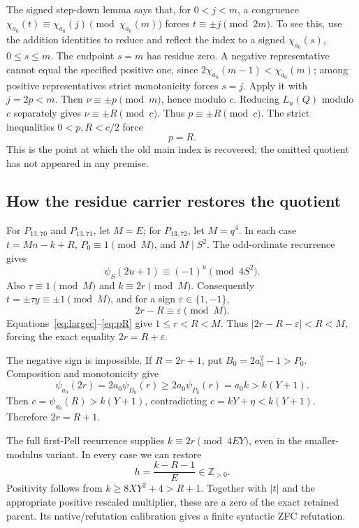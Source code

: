 \documentclass[11pt]{article}
\theoremstyle{remark}\newtheorem{remark}[theorem]{Remark}
\begin{document}
The signed step-down lemma says that, for $0<j<m$, a congruence
$\chi_{a_0}(t)\equiv\chi_{a_0}(j)\pmod{\chi_{a_0}(m)}$
forces $t\equiv\pm j\pmod{2m}$. To see this, use the addition
identities to reduce and reflect the index to a signed
$\chi_{a_0}(s)$, $0\le s\le m$. The endpoint $s=m$ has residue zero.
A negative representative cannot equal the specified positive one,
since $2\chi_{a_0}(m-1)<\chi_{a_0}(m)$; among positive
representatives strict monotonicity forces $s=j$.
Apply it with $j=2p<m$. Then $\nu\equiv\pm p\pmod m$, hence
modulo $c$. Reducing $L_u(Q)$ modulo $c$ separately gives
$\nu\equiv\pm R\pmod c$. Thus $p\equiv\pm R\pmod c$.
The strict inequalities $0<p,R<c/2$ force
\begin{equation}\label{eq:pR}
 p=R.
\end{equation}
This is the point at which the old main index is recovered; the omitted
quotient has not appeared in any premise.

\subsection{How the residue carrier restores the quotient}

For $P_{13,70}$ and $P_{13,71}$, let $M=E$; for $P_{13,72}$, let
$M=q^4$. In each case $t=Mn-k+R$, $P_0\equiv1\pmod M$, and
$M\mid S^2$. The odd-ordinate recurrence gives
\begin{equation}\label{eq:oddres}
 \psi_S(2u+1)\equiv(-1)^u\pmod{4S^2}.
\end{equation}
Also $\tau\equiv1\pmod M$ and $k\equiv2r\pmod M$.
Consequently $t=\pm\tau y\equiv\pm1\pmod M$, and for a sign
$\varepsilon\in\{1,-1\}$,
\[
 2r-R\equiv\varepsilon\pmod M.
\]
Equations~\eqref{eq:largec}--\eqref{eq:pR} give $1\le r<R<M$.
Thus $|2r-R-\varepsilon|<R<M$, forcing the exact equality
$2r=R+\varepsilon$.

The negative sign is impossible. If $R=2r+1$, put $B_0=2a_0^2-1>P_0$.
Composition and monotonicity give
\[
 \psi_{a_0}(2r)=2a_0\psi_{B_0}(r)
     \ge2a_0\psi_{P_0}(r)=a_0k>k(Y+1).
\]
Then $c=\psi_{a_0}(R)>k(Y+1)$, contradicting
$c=kY+\eta<k(Y+1)$. Therefore $2r=R+1$.

The full first-Pell recurrence supplies $k\equiv2r\pmod{4EY}$,
even in the smaller-modulus variant. In every case we can restore
\begin{equation}\label{eq:hrestore}
 h=\frac{k-R-1}{E}\in\mathbb Z_{>0}.
\end{equation}
Positivity follows from $k\ge8XY^2+4>R+1$.
Together with $|t|$ and the appropriate positive rescaled multiplier,
these are a zero of the exact retained parent. Its native/refutation
calibration gives a finite syntactic ZFC refutation.
\end{document}

